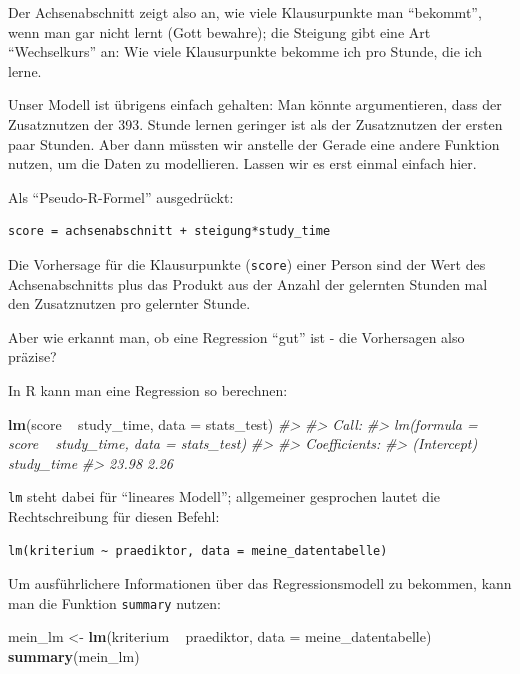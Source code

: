 \documentclass[12pt,ngerman,]{book}
\makeatletter
\newenvironment{Shaded}{\begin{snugshade}}{\end{snugshade}}
\newcommand{\KeywordTok}[1]{\textcolor[rgb]{0.13,0.29,0.53}{\textbf{{#1}}}}
\newcommand{\DataTypeTok}[1]{\textcolor[rgb]{0.13,0.29,0.53}{{#1}}}
\newcommand{\StringTok}[1]{\textcolor[rgb]{0.31,0.60,0.02}{{#1}}}
\newcommand{\CommentTok}[1]{\textcolor[rgb]{0.56,0.35,0.01}{\textit{{#1}}}}
\newcommand{\NormalTok}[1]{{#1}}
\newenvironment{kframe}{%
\medskip{}
\setlength{\fboxsep}{.8em}
 \def\at@end@of@kframe{}%
 \ifinner\ifhmode%
  \def\at@end@of@kframe{\end{minipage}}%
  \begin{minipage}{\columnwidth}%
 \fi\fi%
 \def\FrameCommand##1{\hskip\@totalleftmargin \hskip-\fboxsep
 \colorbox{shadecolor}{##1}\hskip-\fboxsep
     \hskip-\linewidth \hskip-\@totalleftmargin \hskip\columnwidth}%
 \MakeFramed {\advance\hsize-\width
   \@totalleftmargin\z@ \linewidth\hsize
   \@setminipage}}%
 {\par\unskip\endMakeFramed%
 \at@end@of@kframe}
\renewenvironment{Shaded}{\begin{kframe}}{\end{kframe}}
\theoremstyle{definition}
\theoremstyle{definition}
\theoremstyle{remark}
\makeatother
\begin{document}
Der Achsenabschnitt zeigt also an, wie viele Klausurpunkte man
``bekommt'', wenn man gar nicht lernt (Gott bewahre); die Steigung gibt
eine Art ``Wechselkurs'' an: Wie viele Klausurpunkte bekomme ich pro
Stunde, die ich lerne.

Unser Modell ist übrigens einfach gehalten: Man könnte argumentieren,
dass der Zusatznutzen der 393. Stunde lernen geringer ist als der
Zusatznutzen der ersten paar Stunden. Aber dann müssten wir anstelle der
Gerade eine andere Funktion nutzen, um die Daten zu modellieren. Lassen
wir es erst einmal einfach hier.

Als ``Pseudo-R-Formel'' ausgedrückt:

\begin{verbatim}
score = achsenabschnitt + steigung*study_time
\end{verbatim}

Die Vorhersage für die Klausurpunkte (\texttt{score}) einer Person sind
der Wert des Achsenabschnitts plus das Produkt aus der Anzahl der
gelernten Stunden mal den Zusatznutzen pro gelernter Stunde.

Aber wie erkannt man, ob eine Regression ``gut'' ist - die Vorhersagen
also präzise?

In R kann man eine Regression so berechnen:

\begin{Shaded}
\begin{Highlighting}[]
\KeywordTok{lm}\NormalTok{(score ~}\StringTok{ }\NormalTok{study_time, }\DataTypeTok{data =} \NormalTok{stats_test)}
\CommentTok{#> }
\CommentTok{#> Call:}
\CommentTok{#> lm(formula = score ~ study_time, data = stats_test)}
\CommentTok{#> }
\CommentTok{#> Coefficients:}
\CommentTok{#> (Intercept)   study_time  }
\CommentTok{#>       23.98         2.26}
\end{Highlighting}
\end{Shaded}

\texttt{lm} steht dabei für ``lineares Modell''; allgemeiner gesprochen
lautet die Rechtschreibung für diesen Befehl:

\begin{verbatim}
lm(kriterium ~ praediktor, data = meine_datentabelle)
\end{verbatim}

Um ausführlichere Informationen über das Regressionsmodell zu bekommen,
kann man die Funktion \texttt{summary} nutzen:

\begin{Shaded}
\begin{Highlighting}[]
\NormalTok{mein_lm <-}\StringTok{ }\KeywordTok{lm}\NormalTok{(kriterium ~}\StringTok{ }\NormalTok{praediktor, }\DataTypeTok{data =} \NormalTok{meine_datentabelle)}
\KeywordTok{summary}\NormalTok{(mein_lm)}
\end{Highlighting}
\end{Shaded}
\end{document}
